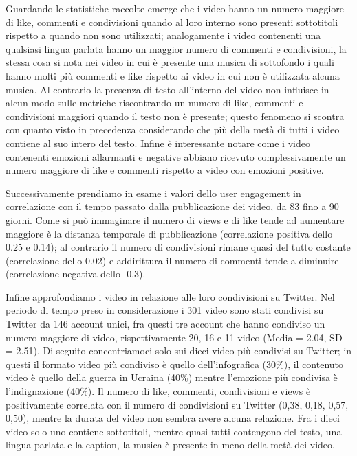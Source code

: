Guardando le statistiche raccolte emerge che i video hanno un numero maggiore di like, commenti e condivisioni quando al loro interno 
sono presenti sottotitoli rispetto a quando non sono utilizzati; analogamente i video contenenti una qualsiasi lingua parlata 
hanno un maggior numero di commenti e condivisioni, la stessa cosa si nota nei video in cui è presente una musica di sottofondo i 
quali hanno molti più commenti e like rispetto ai video in cui non è utilizzata alcuna musica. 
Al contrario la presenza di testo all'interno del video non influisce in alcun modo sulle metriche riscontrando un numero 
di like, commenti e condivisioni maggiori quando il testo non è presente; questo fenomeno si scontra con quanto visto 
in precedenza considerando che più della metà di tutti i video contiene al suo intero del testo.
Infine è interessante notare come i video contenenti emozioni allarmanti e negative abbiano ricevuto complessivamente 
un numero maggiore di like e commenti rispetto a video con emozioni positive.

Successivamente prendiamo in esame i valori dello user engagement in correlazione con il tempo passato dalla pubblicazione 
dei video, da 83 fino a 90 giorni. 
Come si può immaginare il numero di views e di like tende ad aumentare maggiore è la distanza temporale di pubblicazione (correlazione 
positiva dello 0.25 e 0.14); al contrario il numero di condivisioni rimane quasi del tutto costante (correlazione dello 0.02) e 
addirittura il numero di commenti tende a diminuire (correlazione negativa dello -0.3).

Infine approfondiamo i video in relazione alle loro condivisioni su Twitter. 
Nel periodo di tempo preso in considerazione i 301 video sono stati condivisi su Twitter da 146 account unici, 
fra questi tre account che hanno condiviso un numero maggiore di video, rispettivamente 20, 16 e 11 video (Media = 2.04, SD = 2.51). 
Di seguito concentriamoci solo sui dieci video più condivisi su Twitter; in questi il formato video più condiviso è quello 
dell'infografica (30\%), il contenuto video è quello della guerra in Ucraina (40\%) mentre l'emozione più condivisa è 
l'indignazione (40\%). 
Il numero di like, commenti, condivisioni e views è positivamente correlata con il numero di condivisioni su Twitter 
(0,38, 0,18, 0,57, 0,50), mentre la durata del video non sembra avere alcuna relazione. 
Fra i dieci video solo uno contiene sottotitoli, mentre quasi tutti contengono del testo, una lingua parlata e la caption, 
la musica è presente in meno della metà dei video. 
